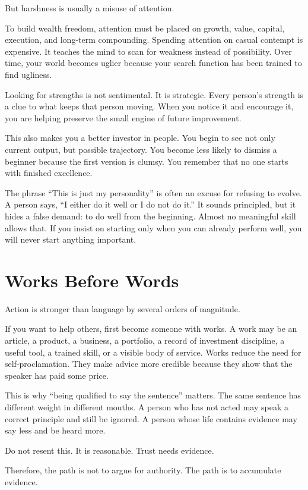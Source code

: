 But harshness is usually a misuse of attention.

To build wealth freedom, attention must be placed on growth, value, capital, execution, and long-term compounding. Spending attention on casual contempt is expensive. It teaches the mind to scan for weakness instead of possibility. Over time, your world becomes uglier because your search function has been trained to find ugliness.

Looking for strengths is not sentimental. It is strategic. Every person's strength is a clue to what keeps that person moving. When you notice it and encourage it, you are helping preserve the small engine of future improvement.

This also makes you a better investor in people. You begin to see not only current output, but possible trajectory. You become less likely to dismiss a beginner because the first version is clumsy. You remember that no one starts with finished excellence.

The phrase ``This is just my personality'' is often an excuse for refusing to evolve. A person says, ``I either do it well or I do not do it.'' It sounds principled, but it hides a false demand: to do well from the beginning. Almost no meaningful skill allows that. If you insist on starting only when you can already perform well, you will never start anything important.

\section*{Works Before Words}

Action is stronger than language by several orders of magnitude.

If you want to help others, first become someone with works. A work may be an article, a product, a business, a portfolio, a record of investment discipline, a useful tool, a trained skill, or a visible body of service. Works reduce the need for self-proclamation. They make advice more credible because they show that the speaker has paid some price.

This is why ``being qualified to say the sentence'' matters. The same sentence has different weight in different mouths. A person who has not acted may speak a correct principle and still be ignored. A person whose life contains evidence may say less and be heard more.

Do not resent this. It is reasonable. Trust needs evidence.

Therefore, the path is not to argue for authority. The path is to accumulate evidence.

